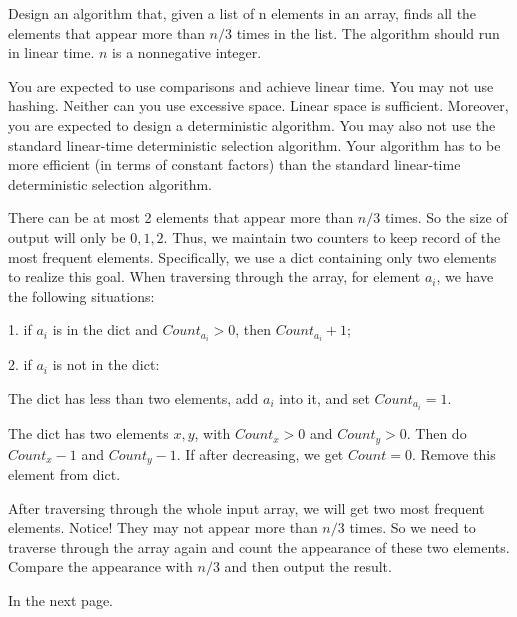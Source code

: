\newpage
{} %

\problemdes

Design an algorithm that, given a list of n elements in an array, finds all the elements that appear more than $n/3$ times in the list. The algorithm should run in linear time. $n$ is a nonnegative integer. 

You are expected to use comparisons and achieve linear time. You may not use hashing. Neither can you use excessive space. Linear space is sufficient. Moreover, you are expected to design a deterministic algorithm. You may also not use the standard linear-time deterministic selection algorithm. Your algorithm has to be more efficient (in terms of constant factors) than the standard linear-time deterministic selection algorithm.

\solution


There can be at most 2 elements that appear more than $n/3$ times. So the size of output will only be $0, 1, 2$. Thus, we maintain two counters to keep record of the most frequent elements. Specifically, we use a dict containing only two elements to realize this goal. When traversing through the array, for element $a_i$, we have the following situations:

1. if $a_i$ is in the dict and $Count_{a_i} > 0$, then $Count_{a_i}+1$; 

2. if $a_i$ is not in the dict:

\indent {} The dict has less than two elements, add $a_i$ into it, and set $Count_{a_i}=1$.

\indent {} The dict has two elements $x, y$, with $Count_{x} > 0$ and $Count_{y} > 0$. Then do $Count_{x} -1$ and $Count_{y} -1$. If after decreasing, we get $Count = 0$. Remove this element from dict.

After traversing through the whole input array, we will get two most frequent elements. Notice! They may not appear more than $n/3$ times. So we need to traverse through the array again and count the appearance of these two elements. Compare the appearance with $n/3$ and then output the result.


In the next page.

